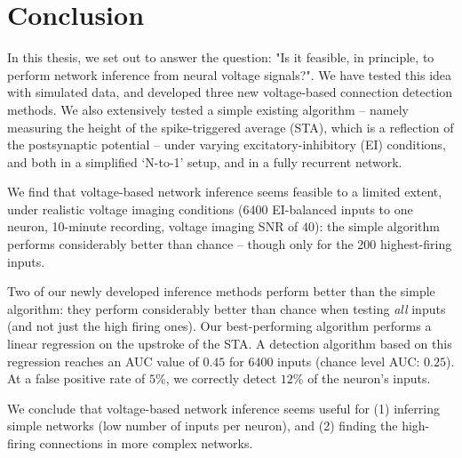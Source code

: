 


\section{Conclusion}

In this thesis, we set out to answer the question: "Is it feasible, in principle, to perform network inference from neural voltage signals?". We have tested this idea with simulated data, and developed three new voltage-based connection detection methods.
We also extensively tested a simple existing algorithm -- namely measuring the height of the spike-triggered average (STA), which is a reflection of the postsynaptic potential -- under varying excitatory-inhibitory (EI) conditions, and both in a simplified `N-to-1' setup, and in a fully recurrent network.

We find that voltage-based network inference seems feasible to a limited extent, under realistic voltage imaging conditions ($6400$ EI-balanced inputs to one neuron, 10-minute
recording, voltage imaging SNR of $40$): the simple algorithm performs considerably better than chance -- though only for the 200 highest-firing inputs.

Two of our newly developed inference methods perform better than the simple algorithm: they perform considerably better than chance when testing \emph{all} inputs (and not just the high firing ones). Our best-performing algorithm performs a linear regression on the upstroke of the STA. A detection algorithm based on this regression reaches an AUC value of $0.45$ for $6400$ inputs (chance level AUC: $0.25$). At a false positive rate of $5$\%, we correctly detect $12$\% of the neuron's inputs.

We conclude that voltage-based network inference seems useful for (1) inferring simple networks (low number of inputs per neuron), and (2) finding the high-firing connections in more complex networks.
